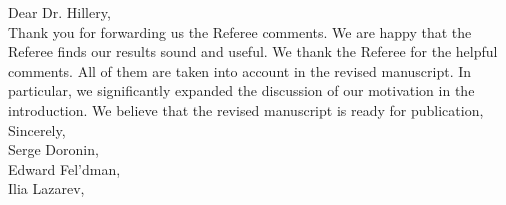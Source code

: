 Dear Dr. Hillery, \\
Thank you for forwarding us the Referee comments. We are happy that the Referee finds our results sound and useful. We thank the Referee for the helpful comments. All of them are taken into account in the revised manuscript. In particular, we significantly expanded the discussion of our motivation in the introduction. We believe that the revised manuscript is ready for publication, 
Sincerely, \\
Serge Doronin, \\
Edward Fel'dman, \\
Ilia Lazarev,  \\